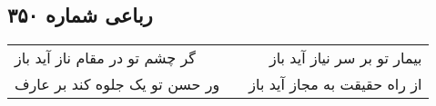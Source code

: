 \begin{center}
\section*{رباعی شماره ۳۵۰}
\label{sec:sh350}
\begin{longtable}{l p{0.5cm} r}
گر چشم تو در مقام ناز آید باز
&&
بیمار تو بر سر نیاز آید باز
\\
ور حسن تو یک جلوه کند بر عارف
&&
از راه حقیقت به مجاز آید باز
\\
\end{longtable}
\end{center}
